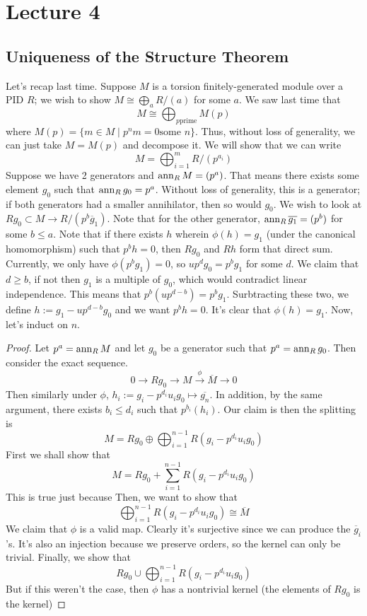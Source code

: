 \section{Lecture 4}
\subsection{Uniqueness of the Structure Theorem}
Let's recap last time. Suppose $M$ is a torsion finitely-generated module over a PID $R$; we wish to show
$M \cong \bigoplus_a R/(a)$ for some $a$.
We saw last time that
\[ M \cong \bigoplus_{p \text{prime}} M(p) \]
where $M(p) = \{ m \in M \mid p^n m = 0 \text{some } n \}$. Thus, without loss of generality, we can just take
$M = M(p)$ and decompose it. We will show that we can write
\[ M = \bigoplus_{i = 1}^m R/(p^{a_i}) \]
Suppose we have 2 generators and $\operatorname{ann}_R M = (p^a)$. That means there exists some element
$g_0$ such that $\operatorname{ann}_R g_0 = p^a$. Without loss of generality,
this is a generator; if both generators had a smaller annihilator, then so would $g_0$.
We wish to look at $Rg_0 \subset M \to R/(p^b \overline{g}_1)$. Note that
for the other generator, $\operatorname{ann}_R \overline{g_1} = (p^b)$ for some $b \le a$.
Note that if there exists $h$ wherein $\phi(h) = g_1$ (under the canonical homomorphism)
such that $p^b h = 0$, then $Rg_0$ and $Rh$ form that direct sum. Currently, we only have $\phi(p^b g_1) = 0$,
so $u p^d g_0 = p^b g_1$ for some $d$. We claim that $d \ge b$, if not then
$g_1$ is a multiple of $g_0$, which would contradict linear independence. This means that $p^b (u p^{d - b}) = p^b g_1$. Surbtracting these two, we define
$h :=  g_1 - u p^{d - b} g_0$ and we want $p^b h = 0$. It's clear that $\phi(h) = g_1$. Now, let's induct on $n$.
\begin{proof}
    Let $p^a = \operatorname{ann}_R M$ and let $g_0$ be a generator such that $p^a = \operatorname{ann}_R g_0$. Then
    consider the exact sequence.
    \[ 0 \to Rg_0 \to M \xrightarrow{\phi} \overline{M} \to 0 \]
    Then similarly under $\phi$, $h_i := g_i - p^{d_i} u_i g_0 \mapsto \overline{g_n}$. In addition, by the same argument,
    there exists $b_i \le d_i$ such that $p^{b_i}(h_i)$. Our claim is then the splitting is
    \[ M = Rg_0 \oplus \bigoplus_{i = 1}^{n - 1} R(g_i - p^{d_i} u_i g_0) \] 
    First we shall show that
    \[ M = Rg_0 + \sum_{i = 1}^{n - 1} R(g_i - p^{d_i} u_i g_0)\]
    This is true just because 
    Then, we want to show that
    \[ \bigoplus_{i = 1}^{n - 1} R(g_i - p^{d_i} u_i g_0) \cong \overline{M} \]
    We claim that $\phi$ is a valid map. Clearly it's surjective since we can produce the $\overline{g}_i$'s.
    It's also an injection because we preserve orders, so the kernel can only be trivial.
    Finally, we show that 
    \[ Rg_0 \cup \bigoplus_{i = 1}^{n - 1} R(g_i - p^{d_i} u_i g_0) \]
    But if this weren't the case, then $\phi$ has a nontrivial kernel (the elements of $Rg_0$ is the kernel)
\end{proof}
